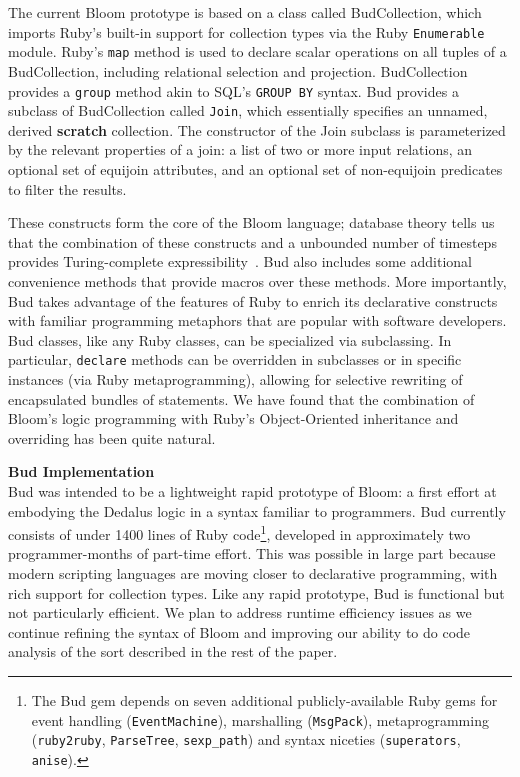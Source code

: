The current Bloom prototype is based on a class called BudCollection, which imports Ruby's built-in support for collection types via the Ruby {\tt Enumerable} module.  Ruby's {\tt map} method is used to declare scalar operations on all tuples of a BudCollection, including relational selection and projection.      BudCollection provides a {\tt group} method akin to SQL's {\tt GROUP BY} syntax.         Bud provides a subclass of BudCollection called {\tt Join}, which essentially specifies an unnamed, derived {\bf scratch} collection.  The constructor of the Join subclass is parameterized by the relevant properties of a join: a list of two or more input relations, an optional set of equijoin attributes, and an optional set of non-equijoin predicates to filter the results.  

These constructs form the core of the Bloom language; database theory tells us that the combination of these constructs and a unbounded number of timesteps provides Turing-complete expressibility~\cite{christospaper}.  Bud also includes some additional convenience methods that provide macros over these methods.  More importantly, Bud takes advantage of the features of Ruby to enrich its declarative constructs with familiar programming metaphors that are popular with software developers.  Bud classes, like any Ruby classes, can be specialized via subclassing.  In particular, {\tt declare} methods can be overridden in subclasses or in specific instances (via Ruby metaprogramming), allowing for selective rewriting of encapsulated bundles of statements.  We have found that the combination of Bloom's logic programming with Ruby's Object-Oriented inheritance and overriding has been quite natural.

{\bf Bud Implementation}\\
Bud was intended to be a lightweight rapid prototype of Bloom: a first effort at embodying the Dedalus logic in a syntax familiar to programmers.  Bud currently consists of under 1400 lines of Ruby code\footnote{The Bud gem depends on seven additional publicly-available Ruby gems for event handling ({\tt EventMachine}), marshalling ({\tt MsgPack}), metaprogramming ({\tt ruby2ruby}, {\tt ParseTree}, {\tt sexp\_path}) and syntax niceties ({\tt superators}, {\tt anise}).}, developed in approximately two programmer-months of part-time effort.  This was possible in large part because modern scripting languages are moving closer to declarative programming, with rich support for collection types.  Like any rapid prototype, Bud is functional but not particularly efficient.  We plan to address runtime efficiency issues as we continue refining the syntax of Bloom and improving our ability to do code analysis of the sort described in the rest of the paper.


